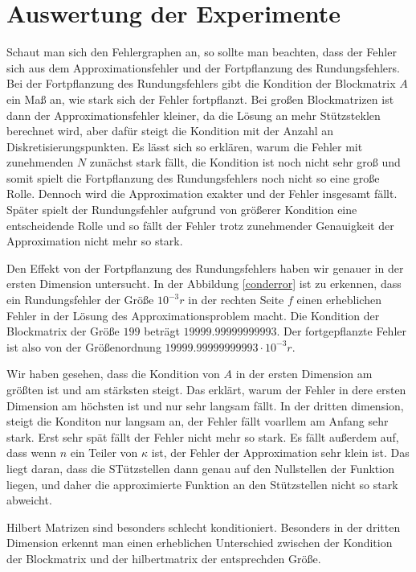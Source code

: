 \documentclass[smallheadings]{scrartcl}
\theoremstyle{definition}
\begin{document}
\section{Auswertung der Experimente}

Schaut man sich den Fehlergraphen an, so sollte man beachten, dass der Fehler sich aus dem Approximationsfehler und der Fortpflanzung des Rundungsfehlers. Bei der Fortpflanzung des Rundungsfehlers gibt die Kondition der Blockmatrix $A$ ein Maß an, wie stark sich der Fehler fortpflanzt. Bei großen Blockmatrizen ist dann der Approximationsfehler kleiner, da die Lösung an mehr Stützsteklen berechnet wird, aber dafür steigt die Kondition mit der Anzahl an Diskretisierungspunkten. Es lässt sich so erklären, warum die Fehler mit zunehmenden $N$ zunächst stark fällt, die Kondition ist noch nicht sehr groß und somit spielt die Fortpflanzung des Rundungsfehlers noch nicht so eine große Rolle. Dennoch wird die Approximation exakter und der Fehler insgesamt fällt. Später spielt der Rundungsfehler aufgrund von größerer Kondition eine entscheidende Rolle und so fällt der Fehler trotz zunehmender Genauigkeit der Approximation nicht mehr so stark.

Den Effekt von der Fortpflanzung des Rundungsfehlers haben wir genauer in der ersten Dimension untersucht. In der Abbildung \ref{conderror} ist zu erkennen, dass ein Rundungsfehler der Größe $10^{-3}r$ in der rechten Seite $f$ einen erheblichen Fehler in der Lösung des Approximationsproblem macht. Die Kondition der Blockmatrix der Größe $199$ beträgt $19999.99999999993$. Der fortgepflanzte Fehler ist also von der Größenordnung $19999.99999999993\cdot 10^{-3}r$. 

Wir haben gesehen, dass die Kondition von $A$ in der ersten Dimension am größten ist und am stärksten steigt. Das erklärt, warum der Fehler in dere ersten Dimension am höchsten ist und nur sehr langsam fällt. In der dritten dimension, steigt die Konditon nur langsam an, der Fehler fällt voarllem am Anfang sehr stark. Erst sehr spät fällt der Fehler nicht mehr so stark. Es fällt außerdem auf, dass wenn $n$  ein Teiler von $\kappa$ ist, der Fehler der Approximation sehr klein ist. Das liegt daran, dass die STützstellen dann genau auf den Nullstellen der Funktion liegen, und daher die approximierte Funktion an den Stützstellen nicht so stark abweicht.

Hilbert Matrizen sind besonders schlecht konditioniert. Besonders in der dritten Dimension erkennt man einen erheblichen Unterschied zwischen der Kondition der Blockmatrix und der hilbertmatrix der entsprechden Größe. 
\end{document}
